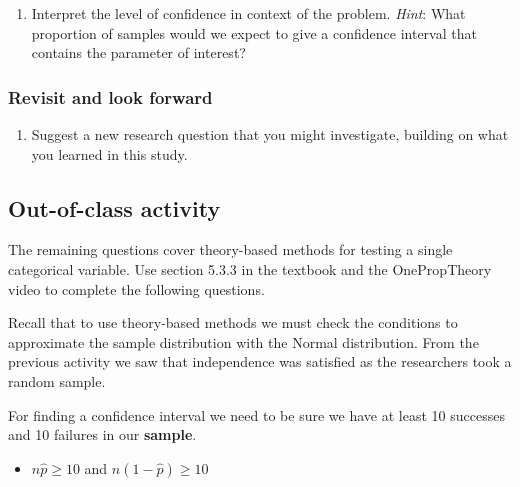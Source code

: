 \documentclass[
]{report}
\providecommand{\tightlist}{%
  \setlength{\itemsep}{0pt}\setlength{\parskip}{0pt}}
\begin{document}
\vspace{0.5in}

\begin{enumerate}
\def\labelenumi{\arabic{enumi}.}
\setcounter{enumi}{17}
\tightlist
\item
  Interpret the level of confidence in context of the problem. \emph{Hint}: What proportion of samples would we expect to give a confidence interval that contains the parameter of interest?
\end{enumerate}

\vspace{1in}

\hypertarget{revisit-and-look-forward-1}{%
\subsubsection*{Revisit and look forward}\label{revisit-and-look-forward-1}}

\begin{enumerate}
\def\labelenumi{\arabic{enumi}.}
\setcounter{enumi}{18}
\tightlist
\item
  Suggest a new research question that you might investigate, building on what you learned in this study.
\end{enumerate}

\vspace{.6in}

\hypertarget{out-of-class-activity-6}{%
\subsection{Out-of-class activity}\label{out-of-class-activity-6}}

The remaining questions cover theory-based methods for testing a single categorical variable. Use section 5.3.3 in the textbook and the OnePropTheory video to complete the following questions.

Recall that to use theory-based methods we must check the conditions to approximate the sample distribution with the Normal distribution. From the previous activity we saw that independence was satisfied as the researchers took a random sample.

For finding a confidence interval we need to be sure we have at least 10 successes and 10 failures in our \textbf{sample}.

\begin{itemize}
\tightlist
\item
  \(n\hat{p}≥10\) and \(n(1-\hat{p})≥10\)
\end{itemize}
\end{document}
